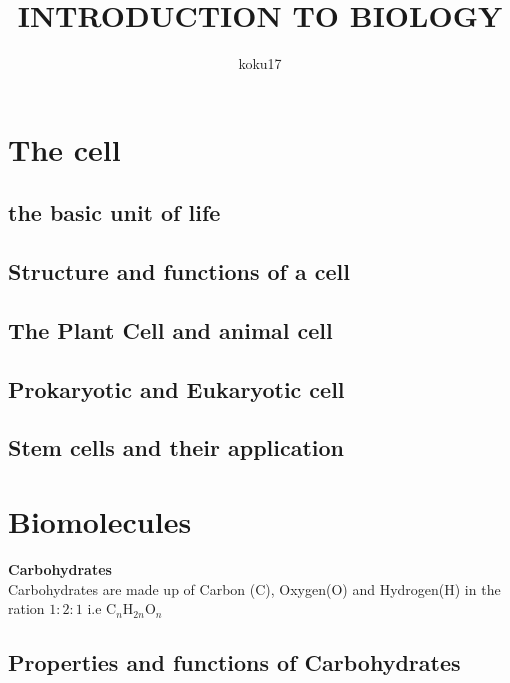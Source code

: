 \documentclass{article}
\author{koku17}
\title{INTRODUCTION TO BIOLOGY}
\begin{document}
	\maketitle \thispagestyle{empty} \newpage
	\tableofcontents \thispagestyle{empty} \newpage \setcounter{page}{1}
	\section{The cell}
	\subsection{the basic unit of life}
	\subsection{Structure and functions of a cell}
	\subsection{The Plant Cell and animal cell}
	\subsection{Prokaryotic and Eukaryotic cell}
	\subsection{Stem cells and their application}

	\section{Biomolecules}
	\textbf{Carbohydrates} \\
	Carbohydrates are made up of Carbon (C), Oxygen(O) and Hydrogen(H) in the ration $1:2:1$ i.e
		$\text{C}_n\text{H}_{2n}\text{O}_n$

	\subsection{Properties and functions of Carbohydrates}
\end{document}

